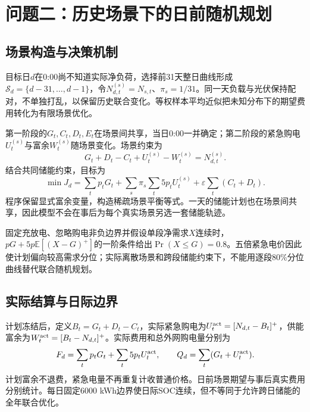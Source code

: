 \section{问题二：历史场景下的日前随机规划}
\subsection{场景构造与决策机制}
目标日$d$在0:00尚不知道实际净负荷，选择前31天整日曲线形成$\mathcal S_d=\{d-31,\ldots,d-1\}$，令$N_{d,t}^{(s)}=N_{s,t}$、$\pi_s=1/31$。同一天负载与光伏保持配对，不单独打乱，以保留历史联合变化。等权样本平均近似把未知分布下的期望费用转化为有限场景优化。

第一阶段的$G_t,C_t,D_t,E_t$在场景间共享，当日0:00一并确定；第二阶段的紧急购电$U_t^{(s)}$与富余$W_t^{(s)}$随场景变化。场景约束为
\begin{equation}G_t+D_t-C_t+U_t^{(s)}-W_t^{(s)}=N_{d,t}^{(s)}.\end{equation}
结合共同储能约束，目标为
\begin{equation}\min J_d=\sum_tp_tG_t+\sum_s\pi_s\sum_t5p_tU_t^{(s)}+\varepsilon\sum_t(C_t+D_t).\end{equation}
程序保留显式富余变量，构造稀疏场景平衡等式。一天的储能计划也在场景间共享，因此模型不会在事后为每个真实场景另选一套储能轨迹。

固定充放电、忽略购电非负边界并假设单段净需求$X$连续时，$pG+5p\mathbb E[(X-G)^+]$的一阶条件给出$\Pr(X\leq G)=0.8$。五倍紧急电价因此使计划偏向较高需求分位；实际离散场景和跨段储能约束下，不能用逐段80\%分位曲线替代联合随机规划。

\subsection{实际结算与日际边界}
计划冻结后，定义$B_t=G_t+D_t-C_t$，实际紧急购电为$U_t^{\rm act}=[N_{d,t}-B_t]^+$，供能富余为$W_t^{\rm act}=[B_t-N_{d,t}]^+$。实际费用和总外网购电量分别为
\begin{equation}F_d=\sum_tp_tG_t+\sum_t5p_tU_t^{\rm act},\qquad Q_d=\sum_t(G_t+U_t^{\rm act}).\end{equation}
计划富余不退费，紧急电量不再重复计收普通价格。日前场景期望与事后真实费用分别统计。每日固定6000 kWh边界使日际SOC连续，但不等同于允许跨日储能的全年联合优化。
